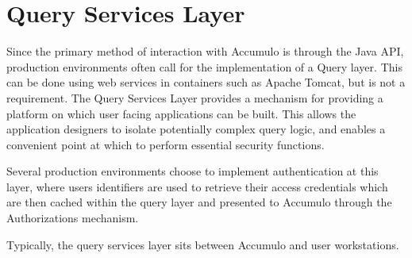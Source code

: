 \section{Query Services Layer}

Since the primary method of interaction with Accumulo is through the Java API,
production environments often call for the implementation of a Query layer. This
can be done using web services in containers such as Apache Tomcat, but is not a
requirement. The Query Services Layer provides a mechanism for providing a
platform on which user facing applications can be built. This allows the application
designers to isolate potentially complex query logic, and enables a convenient point
at which to perform essential security functions.

Several production environments choose to implement authentication at this layer,
where users identifiers are used to retrieve their access credentials which are then
cached within the query layer and presented to Accumulo through the
Authorizations mechanism.

Typically, the query services layer sits between Accumulo and user workstations.
